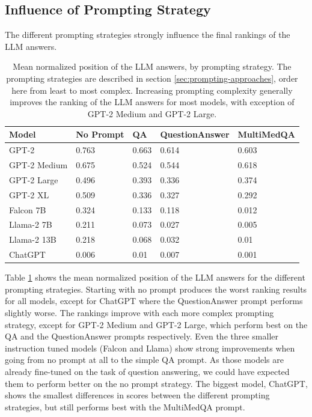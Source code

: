 \subsection{Influence of Prompting Strategy}
The different prompting strategies strongly influence the final rankings of the LLM answers.
\begin{table}[tb]
\centering
\begin{tabular}{lllll}
\hline
\textbf{Model}        & \textbf{No Prompt} & \textbf{QA}     & \textbf{QuestionAnswer} & \textbf{MultiMedQA} \\\hline
GPT-2        & 0.763      & 0.663 & 0.614    & 0.603      \\
GPT-2 Medium & 0.675      & 0.524 & 0.544    & 0.618      \\
GPT-2 Large  & 0.496      & 0.393 & 0.336    & 0.374      \\
GPT-2 XL     & 0.509      & 0.336 & 0.327    & 0.292      \\
Falcon 7B    & 0.324      & 0.133 & 0.118    & 0.012      \\
Llama-2 7B   & 0.211      & 0.073 & 0.027    & 0.005      \\
Llama-2 13B  & 0.218      & 0.068 & 0.032    & 0.01       \\
ChatGPT      & 0.006      & 0.01  & 0.007    & 0.001     \\
\hline
\end{tabular}
\caption{Mean normalized position of the LLM answers, by prompting strategy.
The prompting strategies are described in section \ref{sec:prompting-approaches}, order here from least to most complex.
Increasing prompting complexity generally improves the ranking of the LLM answers for most models, with exception of GPT-2 Medium and GPT-2 Large.
}
\label{tab:prompting_strategy}
\end{table}
Table \ref{tab:prompting_strategy} shows the mean normalized position of the LLM answers for the different prompting strategies.
Starting with no prompt produces the worst ranking results for all models, except for ChatGPT where the QuestionAnswer prompt performs slightly worse.
The rankings improve with each more complex prompting strategy, except for GPT-2 Medium and GPT-2 Large, which perform best on the QA and the QuestionAnswer prompts respectively.
Even the three smaller instruction tuned models (Falcon and Llama) show strong improvements when going from no prompt at all to the simple QA prompt.
As those models are already fine-tuned on the task of question answering, we could have expected them to perform better on the no prompt strategy.
The biggest model, ChatGPT, shows the smallest differences in scores between the different prompting strategies, but still performs best with the MultiMedQA prompt.

